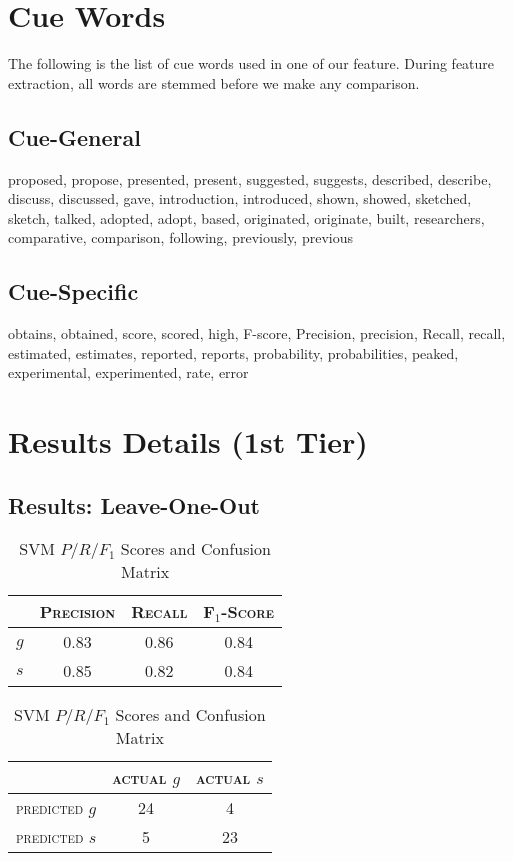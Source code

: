\chapter{Cue Words}
\label{cuewords}
The following is the list of cue words used in one of our feature. During feature extraction, all words are stemmed before we make any comparison.
\section{Cue-General}
proposed, propose, presented, present, suggested, suggests, described, describe, discuss, discussed, gave, introduction, introduced, shown, showed, sketched, sketch, talked, adopted, adopt, based, originated, originate, built, researchers, comparative, comparison, following, previously, previous

\section{Cue-Specific}
obtains, obtained, score, scored, high, F-score, Precision, precision, Recall, recall, estimated, estimates, reported, reports, probability, probabilities, peaked, experimental, experimented, rate, error

\chapter{Results Details (1st Tier)}
\label{resultsdetails}
\section{Results: Leave-One-Out}
\begin{table}[ht]
\begin{minipage}[b]{0.45\linewidth}\centering
\begin{tabular}{ c | c  c  c }
	& \textsc{Precision} & \textsc{Recall} & \textsc{F$_1$-Score} \\
	\hline
	\textsc{$g$} 	& 0.83 & 0.86 & 0.84 \\
	\textsc{$s$}	& 0.85 & 0.82 & 0.84
\end{tabular}
\end{minipage}
\hspace{0.5cm}
\begin{minipage}[b]{0.45\linewidth}\centering
\begin{tabular}{ c | c  c }
	 & \textsc{actual $g$} & \textsc{actual $s$} \\
	\hline
	\textsc{predicted $g$} 	& 24 & 4 \\
	\textsc{predicted $s$}		& 5 & 23
\end{tabular}
\end{minipage}
\caption{SVM $P/R/F_1$ Scores and Confusion Matrix}
\end{table}

